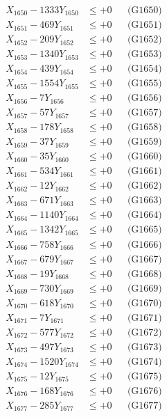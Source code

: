 \documentclass[a4paper,10pt]{article}
\begin{document}
{\begin{align}
X_{1650} - 1333Y_{1650} &\leq +0 && \text{(G1650)} \\
\allowbreak
X_{1651} - 469Y_{1651} &\leq +0 && \text{(G1651)} \\
X_{1652} - 209Y_{1652} &\leq +0 && \text{(G1652)} \\
X_{1653} - 1340Y_{1653} &\leq +0 && \text{(G1653)} \\
X_{1654} - 439Y_{1654} &\leq +0 && \text{(G1654)} \\
X_{1655} - 1554Y_{1655} &\leq +0 && \text{(G1655)} \\
X_{1656} - 7Y_{1656} &\leq +0 && \text{(G1656)} \\
X_{1657} - 57Y_{1657} &\leq +0 && \text{(G1657)} \\
X_{1658} - 178Y_{1658} &\leq +0 && \text{(G1658)} \\
X_{1659} - 37Y_{1659} &\leq +0 && \text{(G1659)} \\
X_{1660} - 35Y_{1660} &\leq +0 && \text{(G1660)} \\
\allowbreak
X_{1661} - 534Y_{1661} &\leq +0 && \text{(G1661)} \\
X_{1662} - 12Y_{1662} &\leq +0 && \text{(G1662)} \\
X_{1663} - 671Y_{1663} &\leq +0 && \text{(G1663)} \\
X_{1664} - 1140Y_{1664} &\leq +0 && \text{(G1664)} \\
X_{1665} - 1342Y_{1665} &\leq +0 && \text{(G1665)} \\
X_{1666} - 758Y_{1666} &\leq +0 && \text{(G1666)} \\
X_{1667} - 679Y_{1667} &\leq +0 && \text{(G1667)} \\
X_{1668} - 19Y_{1668} &\leq +0 && \text{(G1668)} \\
X_{1669} - 730Y_{1669} &\leq +0 && \text{(G1669)} \\
X_{1670} - 618Y_{1670} &\leq +0 && \text{(G1670)} \\
\allowbreak
X_{1671} - 7Y_{1671} &\leq +0 && \text{(G1671)} \\
X_{1672} - 577Y_{1672} &\leq +0 && \text{(G1672)} \\
X_{1673} - 497Y_{1673} &\leq +0 && \text{(G1673)} \\
X_{1674} - 1520Y_{1674} &\leq +0 && \text{(G1674)} \\
X_{1675} - 12Y_{1675} &\leq +0 && \text{(G1675)} \\
X_{1676} - 168Y_{1676} &\leq +0 && \text{(G1676)} \\
X_{1677} - 285Y_{1677} &\leq +0 && \text{(G1677)} \\

\end{align}}
\end{document}
